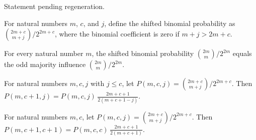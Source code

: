 \begin{theorem}
\label{FABL.totalInfluence_gotsmanLinialExtremizer}
\leanok
{}
Statement pending regeneration.
\end{theorem}

\begin{definition}
\label{FABL.shiftedBinomialProbability}
\leanok
For natural numbers $m$, $c$, and $j$, define the shifted binomial probability as
$\binom{2m+c}{m+j}/2^{2m+c}$, where the binomial coefficient is zero if $m+j>2m+c$.
\end{definition}

\begin{theorem}
\label{FABL.shiftedBinomialProbability_zero}
\leanok
{}
For every natural number $m$, the shifted binomial probability $\binom{2m}{m}/2^{2m}$
equals the odd majority influence $\binom{2m}{m}/2^{2m}$.
\end{theorem}

\begin{theorem}
\label{FABL.shiftedBinomialProbability_succ_same}
\leanok
{}
For natural numbers $m,c,j$ with $j\le c$, let $P(m,c,j)=\binom{2m+c}{m+j}/2^{2m+c}$.
Then $P(m,c+1,j)=P(m,c,j)\,\frac{2m+c+1}{2(m+c+1-j)}$.
\end{theorem}

\begin{theorem}
\label{FABL.shiftedBinomialProbability_succ_diagonal}
\leanok
{}
For natural numbers $m,c$, let $P(m,c,j)=\binom{2m+c}{m+j}/2^{2m+c}$. Then
$P(m,c+1,c+1)=P(m,c,c)\,\frac{2m+c+1}{2(m+c+1)}$.
\end{theorem}

